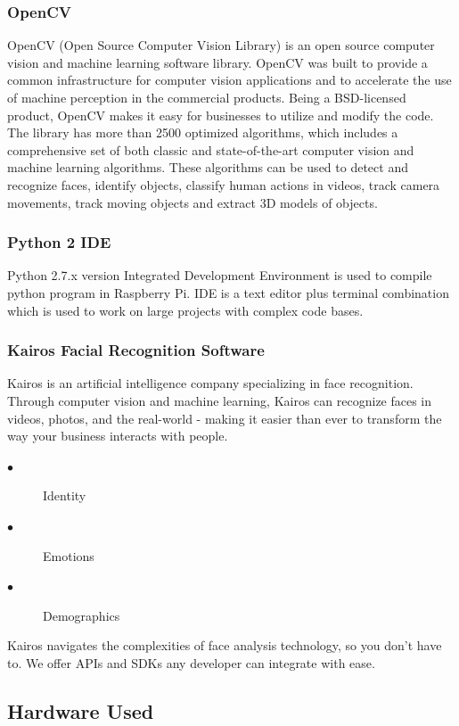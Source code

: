 \documentclass[sigconf]{acmart}
\begin{document}
\subsubsection{OpenCV}
OpenCV (Open Source Computer Vision Library) is an open source computer vision and machine learning software library. OpenCV was built to provide a common infrastructure for computer vision applications and to accelerate the use of machine perception in the commercial products. Being a BSD-licensed product, OpenCV makes it easy for businesses to utilize and modify the code. The library has more than 2500 optimized algorithms, which includes a comprehensive set of both classic and state-of-the-art computer vision and machine learning algorithms. These algorithms can be used to detect and recognize faces, identify objects, classify human actions in videos, track camera movements, track moving objects and extract 3D models of objects.

\subsubsection{Python 2 IDE}
Python 2.7.x version Integrated Development Environment is used to compile python program in Raspberry Pi. IDE is a text editor plus terminal combination which is used to work on large projects with complex code bases.

\subsubsection{Kairos Facial Recognition Software}
Kairos is an artificial intelligence company specializing in face recognition. Through computer vision and machine learning, Kairos can recognize faces in videos, photos, and the real-world - making it easier than ever to transform the way your business interacts with people.
\begin{description}
  \item[$\bullet$] Identity 
  \item[$\bullet$] Emotions 
  \item[$\bullet$] Demographics
\end{description}

Kairos navigates the complexities of face analysis technology, so you don’t have to. We offer APIs and SDKs any developer can integrate with ease.

\subsection{Hardware Used}
\end{document}

